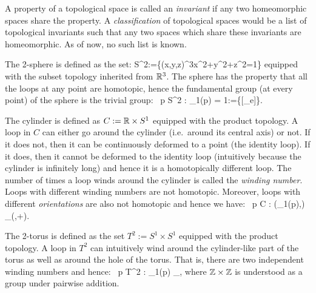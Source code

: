 A property of a topological space is called an \emph{invariant} if any two homeomorphic spaces share the property. A \emph{classification} of topological spaces would be a list of topological invariants such that any two spaces which share these invariants are homeomorphic. As of now, no such list is known. 

\be
The 2-sphere is defined as the set:
\bse
S^2:=\{(x,y,z)\in \R^3\mid x^2+y^2+z^2=1\}
\ese
equipped with the subset topology inherited from $\mathbb{R}^3$. The sphere has the property that all the loops at any point are homotopic, hence the fundamental group (at every point) of the sphere is the trivial group:
\bse
\forall \, p \in S^2 : \pi_1(p) = 1:=\{[\g_e]\}.
\ese
\ee

\be
The cylinder is defined as $C:=\mathbb{R}\times S^1$ equipped with the product topology. A loop in $C$ can either go around the cylinder (i.e.\ around its central axis) or not. If it does not, then it can be continuously deformed to a point (the identity loop). If it does, then it cannot be deformed to the identity loop (intuitively because the cylinder is infinitely long) and hence it is a homotopically different loop. The number of times a loop winds around the cylinder is called the \emph{winding number}. Loops with different winding numbers are not homotopic. Moreover, loops with different \emph{orientations} are also not homotopic and hence we have:
\bse
\forall \, p \in C : (\pi_1(p),\bullet) \cong_(\Z,+).
\ese
\ee

\be
The 2-torus is defined as the set $T^2:=S^1\times S^1$ equipped with the product topology. A loop in $T^2$ can intuitively wind around the cylinder-like part of the torus as well as around the hole of the torus. That is, there are two independent winding numbers and hence:
\bse
\forall \, p \in T^2 : \pi_1(p) \cong_\Z\times \Z,
\ese
where $\mathbb{Z}\times \mathbb{Z}$ is understood as a group under pairwise addition.
\ee







































